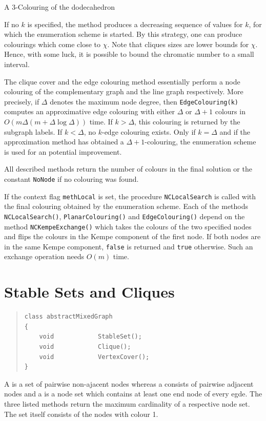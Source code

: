 \documentclass[a4paper,11pt,twoside]{book}
\begin{document}
\begin{multicols}{2}
\bigskip
\begin{figurehere}
\begin{center}
\epsfxsize=8cm
\vspace{0.5cm}
\caption{\label{flb_dodeka}A $3$-Colouring of the dodecahedron}
\end{center}
\end{figurehere}

\noindent
If no $k$ is specified, the method produces a decreasing sequence of values for
$k$, for which the enumeration scheme is started. By this strategy, one can
produce colourings which come close to $\chi$. Note that cliques sizes are lower
bounds for $\chi$. Hence, with some luck, it is possible to bound the chromatic
number to a small interval.

The clique cover and the edge colouring method essentially perform a node
colouring of the complementary graph and the line graph respectively. More
precisely, if $\Delta$ denotes the maximum node degree, then
\verb/EdgeColouring(k)/ computes an approximative edge colouring with either
$\Delta$ or $\Delta+1$ colours in $O(m\Delta(m+\Delta\log{\Delta}))$ time. If
$k>\Delta$, this colouring is returned by the subgraph labels. If $k<\Delta$,
no $k$-edge colouring exists. Only if $k=\Delta$ and if the approximation
method has obtained a $\Delta+1$-colouring, the enumeration scheme is used for
an potential improvement.

All described methods return the number of colours in the final solution or
the constant \verb/NoNode/ if no colouring was found.
 
If the context flag \verb/methLocal/ is set, the procedure \verb/NCLocalSearch/
is called with the final colouring obtained by the enumeration scheme. Each of
the methods \verb/NCLocalSearch()/, \verb/PlanarColouring()/ and \verb/EdgeColouring()/
depend on the method \verb/NCKempeExchange()/ which takes the colours of the two
specified nodes and flips the colours in the Kempe component of the first node.
If both nodes are in the same Kempe component, \verb/false/ is returned and
\verb/true/ otherwise. Such an exchange operation needs $O(m)$ time.




\section{Stable Sets and Cliques}
\label{slb_solve_stable}
\methods
\begin{quote}
\begin{verbatim}
class abstractMixedGraph
{
    void            StableSet();
    void            Clique();
    void            VertexCover();
}
\end{verbatim}
\end{quote}
A  is a set of pairwise non-ajacent nodes whereas a 
consists of pairwise adjacent nodes and a  is a node set which
contains at least one end node of every egde. The three listed methods return
the maximum cardinality of a respective node set. The set itself consists of
the nodes with colour 1.


\end{multicols}
\end{document}
